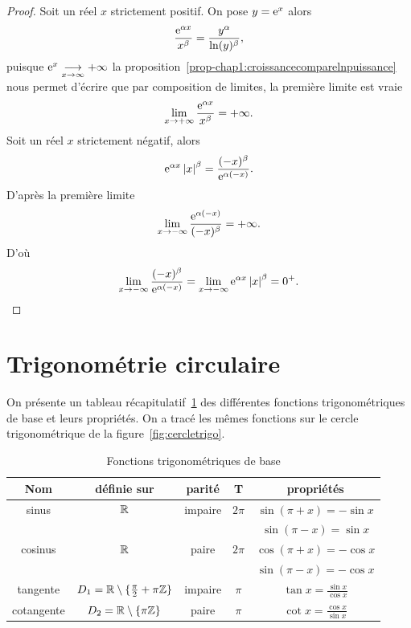 \begin{proof}
  Soit un réel $x$ strictement positif. On pose $y=\operatorname{e}^{x}$ alors
  \begin{equation}
    \frac{\operatorname{e}^{\alpha x}}{x^\beta}=\frac{y^\alpha}{\ln(y)^\beta},
  \end{equation}
  puisque $\operatorname{e}^{x} \underset{x \to \infty}{\longrightarrow}+\infty$ la proposition~\ref{prop-chap1:croissancecomparelnpuissance} nous permet d'écrire que par composition de limites, la première limite est vraie
  \begin{equation}
    \lim\limits_{x \to + \infty} \frac{\operatorname{e}^{\alpha x}}{x^\beta}=+\infty.
  \end{equation}
  Soit un réel $x$ strictement négatif, alors
  \begin{equation}
    \operatorname{e}^{\alpha x}\left\lvert x\right\rvert^\beta=\frac{(-x)^\beta}{\operatorname{e}^{\alpha(-x)}}.
  \end{equation}
  D'après la première limite
  \begin{equation}
    \lim\limits_{x \to - \infty} \frac{\operatorname{e}^{\alpha (-x)}}{(-x)^\beta}=+\infty.
  \end{equation}
  D'où
  \begin{equation}
    \lim\limits_{x\to -\infty}\frac{(-x)^\beta}{\operatorname{e}^{\alpha (-x)}}=\lim\limits_{x \to -\infty} \operatorname{e}^{\alpha x} \left\lvert x\right\rvert^\beta=0^+.
  \end{equation}
\end{proof}
%
\section{Trigonométrie circulaire}
\label{sec:chap1-trigocirc}
On présente un tableau récapitulatif~\ref{tab:fonctiontrigo} des différentes fonctions trigonométriques de base et leurs propriétés. On a tracé les mêmes fonctions sur le cercle trigonométrique de la figure~\ref{fig:cercletrigo}.
\begin{table}[!h]
  \centering
  \begin{tabular}{|c|c|c|c|c|}
    \hline
    Nom & définie sur & parité & T & propriétés \\ \hline
    sinus & $\mathbb{R}$ & impaire & $2\pi$ & $\sin(\pi+x)=-\sin x$ \\
    & & & & $\sin(\pi-x)=\sin x$ \\ \hline
    cosinus & $\mathbb{R}$ & paire & $2\pi$ & $\cos(\pi+x)=-\cos x$\\
    & & & & $ \sin(\pi-x)=-\cos x$ \\ \hline
    tangente & $D_1=\mathbb{R}\setminus\{\frac{\pi}{2}+\pi \mathbb{Z}\}$ & impaire & $\pi$ & $\tan x =\frac{\sin x}{\cos x}$ \\ \hline
    cotangente & $D_2=\mathbb{R}\setminus\{\pi \mathbb{Z}\}$ & paire & $\pi$ & $\cot x =\frac{\cos x}{\sin x}$ \\ \hline
  \end{tabular}
  \caption{Fonctions trigonométriques de base}
  \label{tab:fonctiontrigo}
\end{table}

